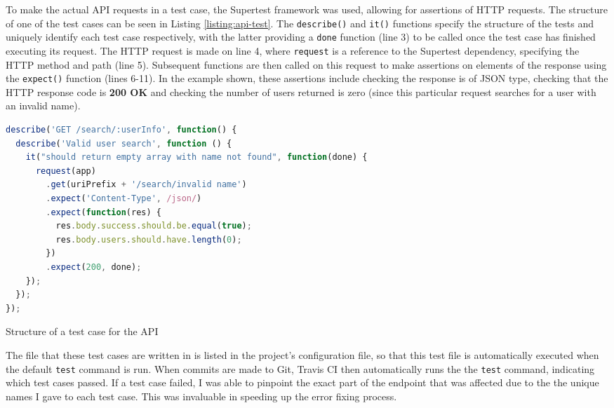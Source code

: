 To make the actual API requests in a test case, the Supertest framework was used, allowing for assertions of HTTP requests. The structure of one of the test cases can be seen in Listing \ref{listing:api-test}. The \verb|describe()| and \verb|it()| functions specify the structure of the tests and uniquely identify each test case respectively, with the latter providing a \verb|done| function (line 3) to be called once the test case has finished executing its request. The HTTP request is made on line 4, where \verb|request| is a reference to the Supertest dependency, specifying the HTTP method and path (line 5). Subsequent functions are then called on this request to make assertions on elements of the response using the \verb|expect()| function (lines 6-11). In the example shown, these assertions include checking the response is of JSON type, checking that the HTTP response code is \textbf{200 OK} and checking the number of users returned is zero (since this particular request searches for a user with an invalid name).

\medskip

\begin{listing}
  \centering
  \begin{lstlisting}[language=javascript]
describe('GET /search/:userInfo', function() {
  describe('Valid user search', function () {
    it("should return empty array with name not found", function(done) {
      request(app)
        .get(uriPrefix + '/search/invalid name')
        .expect('Content-Type', /json/)
        .expect(function(res) {
          res.body.success.should.be.equal(true);
          res.body.users.should.have.length(0);
        })
        .expect(200, done);
    });
  });
});
  \end{lstlisting}
  \caption{Structure of a test case for the API}
  \label{listing:api-test}
\end{listing}


The file that these test cases are written in is listed in the project's configuration file, so that this test file is automatically executed when the default \verb|test| command is run. When commits are made to Git, Travis CI then automatically runs the the \verb|test| command, indicating which test cases passed. If a test case failed, I was able to pinpoint the exact part of the endpoint that was affected due to the the unique names I gave to each test case. This was invaluable in speeding up the error fixing process.


